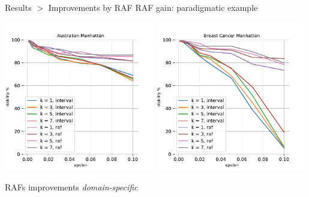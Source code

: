 \documentclass[11pt]{beamer}
\begin{document}
\begin{frame}{Results $>$ Improvements by RAF}
RAF gain: paradigmatic example
\begin{center}
 \includegraphics[width=0.49\textwidth]{assets/charts/australian-manhattan}
 \includegraphics[width=0.49\textwidth]{assets/charts/breast-cancer-manhattan}
\end{center}
RAFs improvements \emph{domain-specific}
\end{frame}
\end{document}
